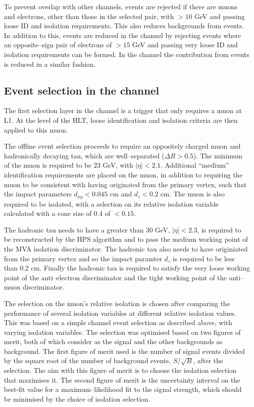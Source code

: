 To prevent overlap with other channels, events are rejected
if there are muons and electrons, other than those in the selected pair,
with \pT $>10$ GeV and passing loose ID and isolation requirements.
This also reduces backgrounds from \WZ events. 
In addition to this, \Zee events are 
reduced in the \etau channel by rejecting events
where an opposite--sign pair of electrons of \pT $>15$ GeV
and passing very loose ID and isolation requirements can be formed. 
In the \mutau channel the contribution from \Zmm events
is reduced in a similar fashion. 




\subsection{\texorpdfstring{Event selection in the \mutau channel}{Event selection in the mu tau channel}}
\label{sec:mssm_eventsel_mt}
The first selection layer in the \mutau channel is a trigger
that only requires a muon at \ac{L1}. At the level of the \ac{HLT}, 
loose identification and isolation criteria are then applied to this muon.

The offline event selection proceeds to require an oppositely charged
muon and hadronically decaying tau, which are well--separated ($\Delta R > 0.5$).
The minimum \pT of the muon is required to be 23 GeV, with $|\eta| < 2.1$. %
Additional ``medium'' identification requirements are placed on the muon, in addition
to requiring the muon to be consistent with having originated from the primary vertex, such that
the impact parameters $d_{xy} < 0.045$ cm and $d_{z} < 0.2$ cm. The muon is also required
to be isolated, with a selection on its relative isolation variable calculated with a cone size of 0.4 of $< 0.15$.

The hadronic tau needs to have a \pT greater than 30 GeV, $|\eta|<2.3$,
is required to be reconstructed by the HPS algorithm and to pass the medium
working point of the MVA isolation discriminator. The hadronic tau also needs
to have originiated from the primary vertex and so the impact paramter $d_{z}$ is 
required to be less than 0.2 cm. Finally the hadronic tau is required
to satisfy the very loose working point of the anti--electron discriminator
and the tight working point of the anti--muon discriminator.

The selection on the muon's relative isolation is chosen after comparing
the performance of several isolation variables at different
relative isolation values. This was based on a simple \mutau channel
event selection as described above, with varying isolation variables.
The selection was optimised based on two figures of merit, both of
which consider \Ztautau as the signal and the other backgrounds
as background. The first figure of merit used is the number of signal events divided by the
square root of the number of background events, $S/\sqrt{B}$, after
the selection. The aim with this figure of merit is to choose
the isolation selection that maximises it. The second figure of merit
is the uncertainty interval on the best-fit value for a maximum--likelihood fit
to the \Ztautau signal strength, which should be minimised by the choice of
isolation selection.

